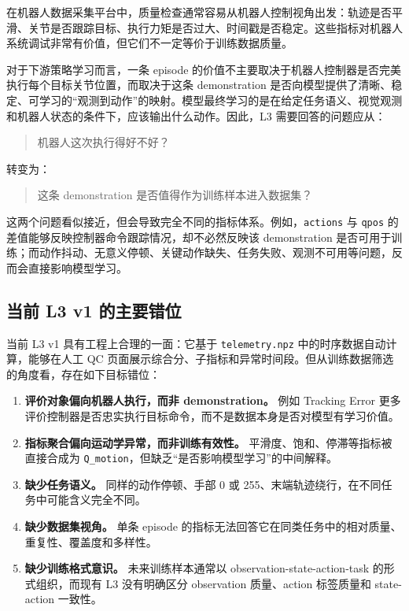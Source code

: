 \documentclass[UTF8,zihao=-4,oneside,openany]{ctexrep}
\begin{document}
在机器人数据采集平台中，质量检查通常容易从机器人控制视角出发：轨迹是否平滑、关节是否跟踪目标、执行力矩是否过大、时间戳是否稳定。这些指标对机器人系统调试非常有价值，但它们不一定等价于训练数据质量。

对于下游策略学习而言，一条 episode 的价值不主要取决于机器人控制器是否完美执行每个目标关节位置，而取决于这条 demonstration 是否向模型提供了清晰、稳定、可学习的“观测到动作”的映射。模型最终学习的是在给定任务语义、视觉观测和机器人状态的条件下，应该输出什么动作。因此，L3 需要回答的问题应从：

\begin{quote}
机器人这次执行得好不好？
\end{quote}

转变为：

\begin{quote}
这条 demonstration 是否值得作为训练样本进入数据集？
\end{quote}

这两个问题看似接近，但会导致完全不同的指标体系。例如，\texttt{actions} 与 \texttt{qpos} 的差值能够反映控制器命令跟踪情况，却不必然反映该 demonstration 是否可用于训练；而动作抖动、无意义停顿、关键动作缺失、任务失败、观测不可用等问题，反而会直接影响模型学习。

\subsection{当前 L3 v1 的主要错位}

当前 L3 v1 具有工程上合理的一面：它基于 \texttt{telemetry.npz} 中的时序数据自动计算，能够在人工 QC 页面展示综合分、子指标和异常时间段。但从训练数据筛选的角度看，存在如下目标错位：

\begin{enumerate}
  \item \textbf{评价对象偏向机器人执行，而非 demonstration。} 例如 Tracking Error 更多评价控制器是否忠实执行目标命令，而不是数据本身是否对模型有学习价值。
  \item \textbf{指标聚合偏向运动学异常，而非训练有效性。} 平滑度、饱和、停滞等指标被直接合成为 \texttt{Q\_motion}，但缺乏“是否影响模型学习”的中间解释。
  \item \textbf{缺少任务语义。} 同样的动作停顿、手部 0 或 255、末端轨迹绕行，在不同任务中可能含义完全不同。
  \item \textbf{缺少数据集视角。} 单条 episode 的指标无法回答它在同类任务中的相对质量、重复性、覆盖度和多样性。
  \item \textbf{缺少训练格式意识。} 未来训练样本通常以 observation-state-action-task 的形式组织，而现有 L3 没有明确区分 observation 质量、action 标签质量和 state-action 一致性。
\end{enumerate}
\end{document}
